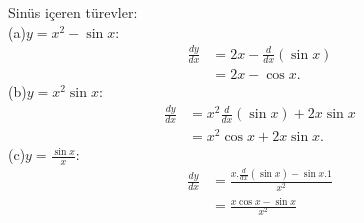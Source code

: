 \begin{ornek}Sinüs içeren türevler:\\

	(a)$y = x^2-\sin x:$
	\begin{equation*}
	\begin{split}
		\frac{dy}{dx}&=2x-\frac{d}{dx}(\sin x)\\
		&= 2x - \cos x.
	\end{split}
	\end{equation*}
	(b)$y=x^2\sin x:$
	\begin{equation*}
	\begin{split}
	\frac{dy}{dx}&=x^2\frac{d}{dx}(\sin x) + 2x\sin x\\
	&= x^2\cos x + 2x\sin x.
	\end{split}
	\end{equation*}
	(c)$\displaystyle y= \frac{\sin x}{x}:$
	\begin{equation*}
	\begin{split}
	\frac{dy}{dx}&=\frac{x.\frac{d}{dx}(\sin x)-\sin x . 1}{x^2}\\
	&=\frac{x \cos x - \sin x}{x^2}
	\end{split}
	\end{equation*}
\end{ornek}
